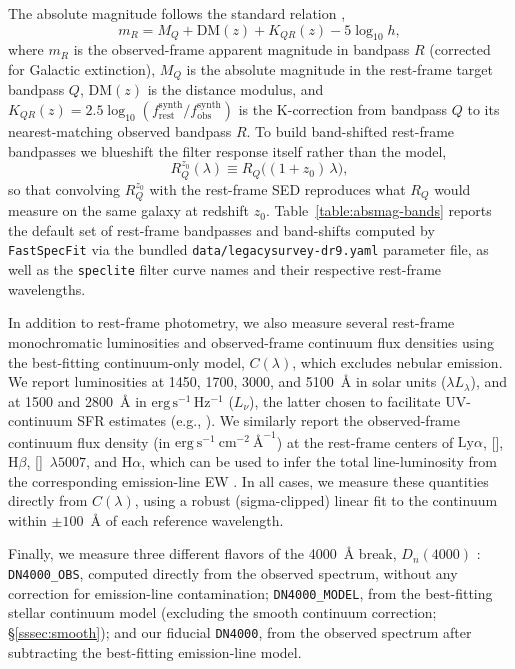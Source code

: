 \documentclass[modern,linenumbers]{aastex702}
\newcommand{\fastspecfit}{\texttt{FastSpecFit}}
\newcommand{\fluxdensity}{\ensuremath{\mathrm{erg~s}^{-1}~\mathrm{cm}^{-2}~\text{\AA}^{-1}}}
\newcommand{\oii}{[\ion{O}{2}]}
\newcommand{\ha}{\ensuremath{\mathrm{H}\alpha}}
\newcommand{\hb}{\ensuremath{\mathrm{H}\beta}}
\newcommand{\lya}{\ensuremath{\mathrm{Ly}\alpha}}
\newcommand{\oiiilam}{[\ion{O}{3}]~$\lambda5007$}
\begin{document}
The absolute magnitude follows the standard relation \citep{blanton07a},
\begin{equation}
  m_R = M_Q + \mathrm{DM}(z) + K_{QR}(z) - 5\log_{10} h,
  \label{eq:kcorr}
\end{equation}
where $m_R$ is the observed-frame apparent magnitude in bandpass $R$
(corrected for Galactic extinction), $M_Q$ is the absolute magnitude
in the rest-frame target bandpass $Q$, $\mathrm{DM}(z)$ is the
distance modulus, and $K_{QR}(z) =
2.5\log_{10}(f_\mathrm{rest}^\mathrm{synth}/f_\mathrm{obs}^\mathrm{synth})$
is the K-correction from bandpass $Q$ to its nearest-matching observed
bandpass $R$. To build band-shifted rest-frame bandpasses
\citep{blanton03a} we blueshift the filter response itself rather than
the model,
\begin{equation}
  R_Q^{z_0}(\lambda) \equiv R_Q\bigl((1+z_0)\,\lambda\bigr),
  \label{eq:bandshift}
\end{equation}
so that convolving $R_Q^{z_0}$ with the rest-frame SED reproduces what
$R_Q$ would measure on the same galaxy at redshift
$z_0$. Table~\ref{table:absmag-bands} reports the default set of
rest-frame bandpasses and band-shifts computed by \fastspecfit{} via
the bundled \texttt{data/legacysurvey-dr9.yaml} parameter file, as
well as the
\texttt{speclite}
filter curve names and their respective rest-frame wavelengths.



In addition to rest-frame photometry, we also measure several
rest-frame monochromatic luminosities and observed-frame continuum
flux densities using the best-fitting continuum-only model,
$C(\lambda)$, which excludes nebular emission. We report luminosities
at 1450, 1700, 3000, and 5100~\AA{} in solar units ($\lambda
L_\lambda$), and at 1500 and 2800~\AA{} in
$\mathrm{erg\,s^{-1}\,Hz^{-1}}$ ($L_\nu$), the latter chosen to
facilitate UV-continuum SFR estimates (e.g.,
\citealt{kennicutt98a}). We similarly report the observed-frame
continuum flux density (in \fluxdensity) at the rest-frame centers of
\lya, \oii, \hb, \oiiilam, and \ha, which can be used to infer the
total line-luminosity from the corresponding emission-line EW
\citep[e.g.,][]{zhu09a}. In all cases, we measure these quantities
directly from $C(\lambda)$, using a robust (sigma-clipped) linear fit
to the continuum within $\pm100$~\AA{} of each reference wavelength.

Finally, we measure three different flavors of the 4000~\AA{} break,
$D_n(4000)$ \citep{balogh99a}: \texttt{DN4000\_OBS}, computed directly
from the observed spectrum, without any correction for emission-line
contamination; \texttt{DN4000\_MODEL}, from the best-fitting stellar
continuum model (excluding the smooth continuum correction;
\S\ref{sssec:smooth}); and our fiducial \texttt{DN4000}, from the
observed spectrum after subtracting the best-fitting emission-line
model.
\end{document}
